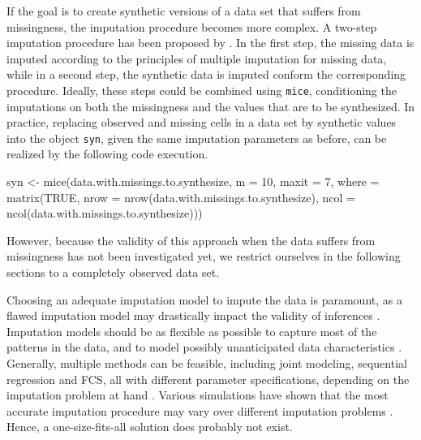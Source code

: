 \documentclass[psych,article,submit,moreauthors,pdftex]{mdpi}
\newenvironment{Shaded}{\begin{snugshade}}{\end{snugshade}}
\newcommand{\AttributeTok}[1]{\textcolor[rgb]{0.77,0.63,0.00}{#1}}
\newcommand{\ConstantTok}[1]{\textcolor[rgb]{0.00,0.00,0.00}{#1}}
\newcommand{\DecValTok}[1]{\textcolor[rgb]{0.00,0.00,0.81}{#1}}
\newcommand{\FunctionTok}[1]{\textcolor[rgb]{0.00,0.00,0.00}{#1}}
\newcommand{\NormalTok}[1]{#1}
\newcommand{\OtherTok}[1]{\textcolor[rgb]{0.56,0.35,0.01}{#1}}
\begin{document}
If the goal is to create synthetic versions of a data set that suffers
from missingness, the imputation procedure becomes more complex. A
two-step imputation procedure has been proposed by
\citet{reiter2004simultaneous}. In the first step, the missing data is
imputed according to the principles of multiple imputation for missing
data, while in a second step, the synthetic data is imputed conform the
corresponding procedure. Ideally, these steps could be combined using
\texttt{mice}, conditioning the imputations on both the missingness and
the values that are to be synthesized. In practice, replacing observed
and missing cells in a data set by synthetic values into the object
\texttt{syn}, given the same imputation parameters as before, can be
realized by the following code execution.

\begin{Shaded}
\begin{Highlighting}[]
\NormalTok{syn }\OtherTok{\textless{}{-}} \FunctionTok{mice}\NormalTok{(data.with.missings.to.synthesize, }
            \AttributeTok{m =} \DecValTok{10}\NormalTok{,}
            \AttributeTok{maxit =} \DecValTok{7}\NormalTok{, }
            \AttributeTok{where =} \FunctionTok{matrix}\NormalTok{(}\ConstantTok{TRUE}\NormalTok{, }
                           \AttributeTok{nrow =} \FunctionTok{nrow}\NormalTok{(data.with.missings.to.synthesize),}
                           \AttributeTok{ncol =} \FunctionTok{ncol}\NormalTok{(data.with.missings.to.synthesize)))}
\end{Highlighting}
\end{Shaded}

However, because the validity of this approach when the data suffers
from missingness has not been investigated yet, we restrict ourselves in
the following sections to a completely observed data set.

Choosing an adequate imputation model to impute the data is paramount,
as a flawed imputation model may drastically impact the validity of
inferences \citep{grund2021using, jiang2021balancing}. Imputation models
should be as flexible as possible to capture most of the patterns in the
data, and to model possibly unanticipated data characteristics
\citep{murray_multiple_2018, rubin_18years_1996}. Generally, multiple
methods can be feasible, including joint modeling, sequential regression
and FCS, all with different parameter specifications, depending on the
imputation problem at hand
\citep{ludtke2020regression, yucel2018sequential, murray2016multiple}.
Various simulations have shown that the most accurate imputation
procedure may vary over different imputation problems
\citep{hanne_review_2021}. Hence, a one-size-fits-all solution does
probably not exist.
\end{document}
